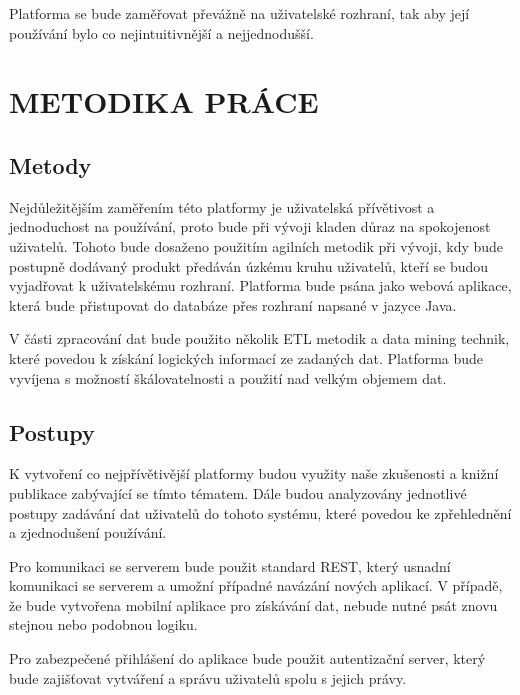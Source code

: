 Platforma se bude zaměřovat převážně na uživatelské rozhraní, tak aby její používání bylo co nejintuitivnější a nejjednodušší.

\chapter*{METODIKA PRÁCE}
\section*{Metody}
\par Nejdůležitějším zaměřením této platformy je uživatelská přívětivost a jednoduchost na používání, proto bude při vývoji kladen důraz na spokojenost uživatelů. Tohoto bude dosaženo použitím agilních metodik při vývoji, kdy bude postupně dodávaný produkt předáván úzkému kruhu uživatelů, kteří se budou vyjadřovat k uživatelskému rozhraní. Platforma bude psána jako webová aplikace, která bude přistupovat do databáze přes rozhraní napsané v jazyce Java.
\par V části zpracování dat bude použito několik ETL metodik a data mining technik, které povedou k získání logických informací ze zadaných dat. Platforma bude vyvíjena s možností 
škálovatelnosti a použití nad velkým objemem dat.

\section*{Postupy}
\par K vytvoření co nejpřívětivější platformy budou využity naše zkušenosti a knižní publikace zabývající se tímto tématem. Dále budou analyzovány jednotlivé postupy zadávání dat uživatelů do tohoto systému, které povedou ke zpřehlednění a zjednodušení používání.
\par Pro komunikaci se serverem bude použit standard REST, který usnadní komunikaci se serverem a umožní případné navázání nových aplikací. V případě, že bude vytvořena mobilní aplikace pro získávání dat, nebude nutné psát znovu stejnou nebo podobnou logiku.
\par Pro zabezpečené přihlášení do aplikace bude použit autentizační server, který bude zajišťovat vytváření a správu uživatelů spolu s jejich právy.


